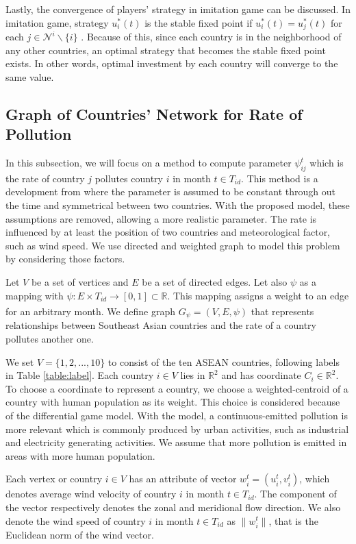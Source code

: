 \documentclass[a4paper,fleqn]{cas-dc}
\begin{document}
Lastly, the convergence of players' strategy in imitation game can be discussed. In imitation game, strategy $u_i^*(t)$ is the stable fixed point if $u_i^*(t)=u_j^*(t)$ for each $j\in\mathcal{N}^i\backslash\{i\}$ \citep{Schuller}. Because of this, since each country is in the neighborhood of any other countries, an optimal strategy that becomes the stable fixed point exists. In other words, optimal investment by each country will converge to the same value.

\subsection{Graph of Countries' Network for Rate of Pollution} \label{subsection:graph network}

In this subsection, we will focus on a method to compute parameter $\psi_{ij}^t$ which is the rate of country $j$ pollutes country $i$ in month $t\in T_{id}$. This method is a development from \citet{Schuller} where the parameter is assumed to be constant through out the time and symmetrical between two countries. With the proposed model, these assumptions are removed, allowing a more realistic parameter. The rate is influenced by at least the position of two countries and meteorological factor, such as wind speed. We use directed and weighted graph to model this problem by considering those factors.

Let $V$ be a set of vertices and $E$ be a set of directed edges. Let also $\psi$ as a mapping with $\psi:E\times T_{id}\xrightarrow[]{} [0,1]\subset\mathbb{R}$. This mapping assigns a weight to an edge for an arbitrary month. We define graph $G_\psi=(V,E,\psi)$ that represents relationships between Southeast Asian countries and the rate of a country pollutes another one.

We set $V=\{1,2,...,10\}$ to consist of the ten ASEAN countries, following labels in Table \ref{table:label}. Each country $i\in V$ lies in $\mathbb{R}^2$ and has coordinate $C_i\in\mathbb{R}^2$. To choose a coordinate to represent a country, we choose a weighted-centroid of a country with human population as its weight. This choice is considered because of the differential game model. With the model, a continuous-emitted pollution is more relevant which is commonly produced by urban activities, such as industrial and electricity generating activities. We assume that more pollution is emitted in areas with more human population.

Each vertex or country $i\in V$ has an attribute of vector $w_i^t=(u_i^t,v_i^t)$, which denotes average wind velocity of country $i$ in month $t\in T_{id}$. The component of the vector respectively denotes the zonal and meridional flow direction. We also denote the wind speed of country $i$ in month $t\in T_{id}$ as $\lVert w_i^t \rVert$, that is the Euclidean norm of the wind vector.
\end{document}
